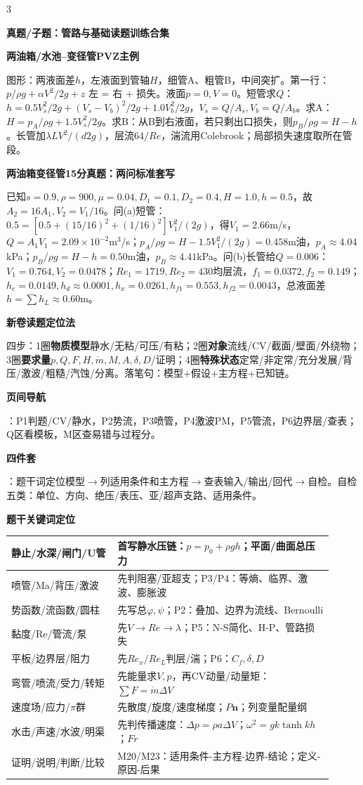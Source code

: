 \documentclass[a4paper]{article}
\newcommand{\qt}[1]{\vspace{0.25pt}\colorbox{Q}{\parbox{\dimexpr\linewidth-2\fboxsep}{\color{white}\bfseries #1}}\par}
\newcommand{\warn}[1]{\colorbox{Y}{\parbox{\dimexpr\linewidth-2\fboxsep}{\color{E}\bfseries #1}}\par}
\newcommand{\sect}[1]{\qt{#1}}
\newcommand{\key}[1]{{\bfseries\color{M}#1}}
\newcommand{\schemabasics}{}
\newcommand{\pvzfig}{}
\begin{document}
\begin{multicols}{3}
\qt{真题/子题：管路与基础读题训练合集}
{\fontsize{2.66}{2.82}\selectfont
\pvzfig
\sect{两油箱/水池--变径管PVZ主例}
图形：两液面差$h$，左液面到管轴$H$，细管A、粗管B，中间突扩。第一行：$p/\rho g+\alpha V^2/2g+z$ 左 = 右 + 损失。液面$p=0,V=0$。短管求$Q$：$h=0.5V_s^2/2g+(V_s-V_b)^2/2g+1.0V_b^2/2g$，$V_s=Q/A_s,V_b=Q/A_b$。求A：$H=p_A/\rho g+1.5V_s^2/2g$。求B：从B到右液面，若只剩出口损失，则$p_B/\rho g=H-h$。长管加$\lambda L V^2/(d2g)$，层流$64/Re$，湍流用Colebrook；局部损失速度取所在管段。\schemabasics
\sect{两油箱变径管15分真题：两问标准套写}
已知$s=0.9,\rho=900,\mu=0.04,D_1=0.1,D_2=0.4,H=1.0,h=0.5$，故$A_2=16A_1,V_2=V_1/16$。问(a)短管：$0.5=[0.5+(15/16)^2+(1/16)^2]V_1^2/(2g)$，得$V_1=2.66$m/s，$Q=A_1V_1=2.09\times10^{-2}$m$^3$/s；$p_A/\rho g=H-1.5V_1^2/(2g)=0.458$m油，$p_A\approx4.04$kPa；$p_B/\rho g=H-h=0.50$m油，$p_B\approx4.41$kPa。问(b)长管给$Q=0.006$：$V_1=0.764,V_2=0.0478$；$Re_1=1719,Re_2=430$均层流，$f_1=0.0372,f_2=0.149$；$h_e=0.0149,h_d\approx0.0001,h_x=0.0261,h_{f1}=0.553,h_{f2}=0.0043$，总液面差$h=\sum h_L\approx0.60$m。
\sect{新卷读题定位法}
四步：1圈\key{物质模型}静水/无粘/可压/有粘；2圈\key{对象}流线/CV/截面/壁面/外绕物；3圈\key{要求量}$p,Q,F,H,\dot m,M,A,\delta,D$/证明；4圈\key{特殊状态}定常/非定常/充分发展/背压/激波/粗糙/汽蚀/分离。落笔句：模型+假设+主方程+已知链。
\warn{页间导航}：P1判题/CV/静水，P2势流，P3喷管，P4激波PM，P5管流，P6边界层/查表；Q区看模板，M区查易错与过程分。
\warn{四件套}：题干词定位模型$\to$列适用条件和主方程$\to$查表输入/输出/回代$\to$自检。自检五类：单位、方向、绝压/表压、亚/超声支路、适用条件。

\sect{题干关键词定位}
\renewcommand{\arraystretch}{0.76}\begin{tabular}{|p{0.30\linewidth}|p{0.61\linewidth}|}
\hline 静止/水深/闸门/U管 & 首写静水压链：$p=p_0+\rho gh$；平面/曲面总压力\\ \hline
喷管/Ma/背压/激波 & 先判阻塞/亚超支；P3/P4：等熵、临界、激波、膨胀波\\ \hline
势函数/流函数/圆柱 & 先写总$\varphi,\psi$；P2：叠加、边界为流线、Bernoulli\\ \hline
黏度/Re/管流/泵 & 先$V\to Re\to\lambda$；P5：N-S简化、H-P、管路损失\\ \hline
平板/边界层/阻力 & 先$Re_x/Re_L$判层/湍；P6：$C_f,\delta,D$\\ \hline
弯管/喷流/受力/转矩 & 先能量求$V,p$，再CV动量/动量矩：$\sum F=\dot m\Delta V$\\ \hline
速度场/应力/$\pi$群 & 先散度/旋度/速度梯度；$P\bm n$；列变量配量纲\\ \hline
水击/声速/水波/明渠 & 先判传播速度：$\Delta p=\rho a\Delta V$；$\omega^2=gk\tanh kh$；$Fr$\\ \hline
证明/说明/判断/比较 & M20/M23：适用条件-主方程-边界-结论；定义-原因-后果\\ \hline
\end{tabular}\renewcommand{\arraystretch}{1}

}
\end{multicols}
\end{document}
